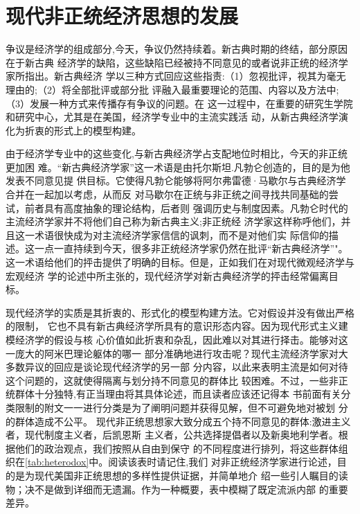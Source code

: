 \chapter{现代非正统经济思想的发展}

争议是经济学的组成部分,今天，争议仍然持续着。新古典时期的终结，部分原因在于新古典
经济学的缺陷，这些缺陷已经被持不同意见的或者说非正统的经济学家所指出。新古典经济
学以三种方式回应这些指责:（1）忽视批评，视其为毫无理由的;（2）将全部批评或部分批
评融入最重要理论的范围、内容以及方法中;（3）发展一种方式来传播存有争议的问题。在
这一过程中，在重要的研究生学院和研究中心，尤其是在美国，经济学专业中的主流实践活
动，从新古典经济学演化为折衷的形式上的模型构建。

由于经济学专业中的这些变化,与新古典经济学占支配地位时相比，今天的非正统更加困
难。“新古典经济学家”这一术语是由托尔斯坦.凡勃仑创造的，目的是为他发表不同意见提
供目标。它使得凡勃仑能够将阿尔弗雷德·马歇尔与古典经济学合并在一起加以考虑，从而反
对马歇尔在正统与非正统之间寻找共同基础的尝试，前者具有高度抽象的理论结构，后者则
强调历史与制度因素。凡勃仑时代的主流经济学家并不将他们自己称为新古典主义;非正统经
济学家这样称呼他们，并且这一术语很快成为对主流经济学家信信的讽刺，而不是对他们实
际信仰的描述。这一点一直持续到今天，很多非正统经济学家仍然在批评“新古典经济学”"。
这一术语给他们的抨击提供了明确的目标。但是，正如我们在对现代微观经济学与宏观经济
学的论述中所主张的，现代经济学对新古典经济学的抨击经常偏离目标。

现代经济学的实质是其折衷的、形式化的模型构建方法。它对假设并没有做出严格的限制，
它也不具有新古典经济学所具有的意识形态内容。因为现代形式主义建模经济学的假设与核
心价值如此折衷和杂乱，因此难以对其进行择击。能够对这一庞大的阿米巴理论躯体的哪一
部分准确地进行攻击呢？现代主流经济学家对大多数异议的回应是谈论现代经济学的另一部
分内容，以此来表明主流是如何对待这个问题的，这就使得隔离与划分持不同意见的群体比
较困难。不过，一些非正统群体十分独特,有正当理由将其具体论述，而且读者应该还记得本
书前面有关分类限制的附文一一进行分类是为了阐明问题并获得见解，但不可避免地对被划
分的群体造成不公平。
\enlargethispage{\baselineskip}
现代非正统思想家大致分成五个持不同意见的群体:激进主义者，现代制度主义者，后凯恩斯
主义者，公共选择提倡者以及新奥地利学者。根据他们的政治观点，我们按照从自由到保守
的不同程度进行排列，将这些群体组织在\cref{tab:heterodox}中。阅读该表时请记住,我们
对非正统经济学家进行论述，目的是为现代美国非正统思想的多样性提供证据，并简单地介
绍一些引人瞩目的读物；决不是做到详细而无遗漏。作为一种概要，表中模糊了既定流派内部
的重要差异。
\clearpage


